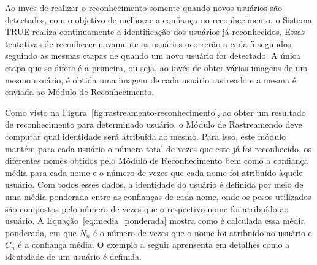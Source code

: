 	
	Ao invés de realizar o reconhecimento somente quando novos usuários são detectados, com o objetivo de melhorar a confiança no reconhecimento, o Sistema TRUE realiza continuamente a identificação dos usuários já reconhecidos. Essas tentativas de reconhecer novamente os usuários ocorrerão a cada 5 segundos seguindo as mesmas etapas de quando um novo usuário for detectado. A única etapa que se difere é a primeira, ou seja, ao invés de obter várias imagens de um mesmo usuário, é obtida uma imagem de cada usuário rastreado e a mesma é enviada ao Módulo de Reconhecimento.

	Como visto na Figura~\ref{fig:rastreamento-reconhecimento}, ao obter um resultado de reconhecimento para determinado usuário, o Módulo de Rastreamendo deve computar qual identidade será atribuída ao mesmo. Para isso, este módulo mantém para cada usuário o número total de vezes que este já foi reconhecido, os diferentes nomes obtidos pelo Módulo de Reconhecimento bem como a confiança média para cada nome e o número de vezes que cada nome foi atribuído àquele usuário. Com todos esses dados, a identidade do usuário é definida por meio de uma média ponderada entre as confianças de cada nome, onde os pesos utilizados são compostos pelo número de vezes que o respectivo nome foi atribuído ao usuário. A Equação~\ref{eq:media_ponderada} mostra como é calculada essa média ponderada, em que $\displaystyle N_n$ é o número de vezes que o nome foi atribuído ao usuário e $\displaystyle C_n$ é a confiança média. O exemplo a seguir aprensenta em detalhes como a identidade de um usuário é definida.

